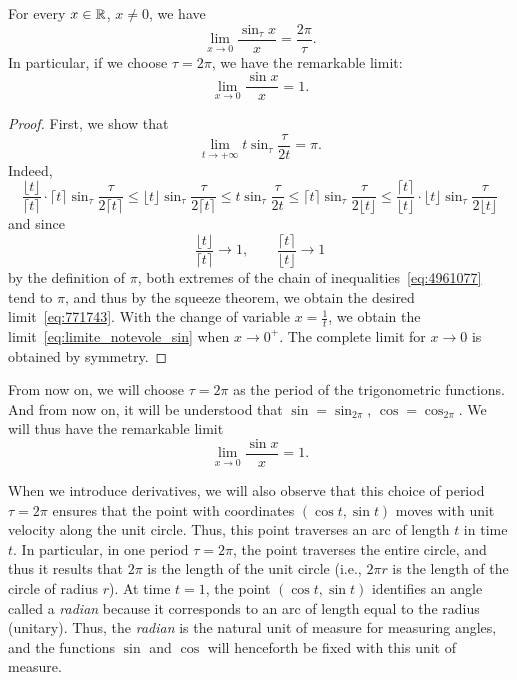 \begin{theorem}
  \label{th:limite_notevole_sin}%
For every $x\in{\mathbb R}$, $x\neq 0$, we have 
\[
\lim_{x\to 0}\frac{\sin_{\tau} x}{x}
= \frac{2\pi}{\tau}.
\]
In particular, if we choose $\tau = 2\pi$, we have the remarkable limit:
\begin{equation}\label{eq:limite_notevole_sin}
 \lim_{x\to 0} \frac{\sin x}{x} = 1.
\end{equation}
\end{theorem}
%
\begin{proof}
First, we show that
\begin{equation}\label{eq:771743}
   \lim_{t\to+\infty} t \sin_\tau \frac{\tau}{2t} = \pi.
\end{equation}
Indeed,
\begin{equation}\label{eq:4961077}
  \frac{\lfloor t \rfloor}{\lceil t \rceil} \cdot \lceil t \rceil \sin_\tau \frac{\tau}{2\lceil t \rceil}
  \le \lfloor t \rfloor \sin_\tau \frac{\tau}{2\lceil t \rceil}
  \le t \sin_\tau \frac{\tau}{2t} 
  \le \lceil t \rceil \sin_\tau \frac{\tau}{2\lfloor t \rfloor}
  \le \frac{\lceil t \rceil}{\lfloor t \rfloor} \cdot \lfloor t \rfloor \sin_\tau \frac{\tau}{2\lfloor t \rfloor}
\end{equation}
and since 
\[
  \frac{\lfloor t \rfloor}{\lceil t \rceil}\to 1, \qquad
  \frac{\lceil t \rceil}{\lfloor t \rfloor}\to 1
\]
by the definition of $\pi$, both extremes of the chain of
inequalities~\eqref{eq:4961077} tend to $\pi$, and thus by the squeeze theorem,
we obtain the desired limit~\eqref{eq:771743}. With the change of variable
$x=\frac 1 t$, we obtain the limit~\eqref{eq:limite_notevole_sin} when $x\to
0^+$. The complete limit for $x\to 0$ is obtained by symmetry.
\end{proof}

From now on, we will choose $\tau=2\pi$ as the period of the trigonometric
functions. And from now on, it will be understood that $\sin = \sin_{2\pi}$,
$\cos = \cos_{2\pi}$. We will thus have the remarkable limit
\[
   \lim_{x\to 0} \frac{\sin x}{x} = 1.  
\]

When we introduce derivatives, we will also observe that this choice of period
$\tau=2\pi$ ensures that the point with coordinates $(\cos t,\sin t)$ moves with
unit velocity along the unit circle. Thus, this point traverses an arc of length
$t$ in time $t$. In particular, in one period $\tau=2\pi$, the point traverses
the entire circle, and thus it results that $2\pi$ is the length of the unit
circle (i.e., $2\pi r$ is the length of the circle of radius $r$). At time
$t=1$, the point $(\cos t,\sin t)$ identifies an angle called a \emph{radian}
because it corresponds to an arc of length equal to the radius (unitary). Thus,
the \emph{radian} is the natural unit of measure for measuring angles, and the
functions $\sin$ and $\cos$ will henceforth be fixed with this unit of measure.

